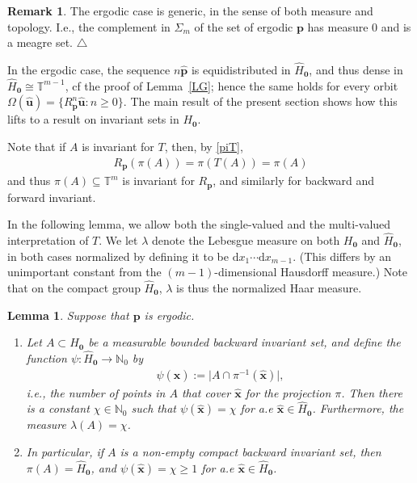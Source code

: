 \documentclass[11pt,reqno,tbtags,a4paper]{amsart}
\numberwithin{equation}{section}
\renewcommand\ge{\geq}
\renewcommand\geq{\geqslant}
\theoremstyle{plain}%
\newtheorem{lemma}[theorem]{Lemma}
\theoremstyle{definition}
\newcommand\xqed[1]{%
    \leavevmode\unskip\penalty9999 \hbox{}\nobreak\hfill
    \quad\hbox{#1}}
\newtheorem{remarkqqq}[theorem]{Remark}
\newenvironment{remark}{\begin{remarkqqq}}
  {\xqed{$\triangle$}\end{remarkqqq}}
\theoremstyle{remark}
\newenvironment{romenumerate}[1][-10pt]{%
\addtolength{\leftmargini}{#1}\begin{enumerate}%
 \renewcommand{\labelenumi}{\textup{(\roman{enumi})}}%
 \renewcommand{\theenumi}{\labelenumi}%
%
 }{\end{enumerate}}
\newcounter{cases}
\newcommand{\refL}[1]{Lemma~\ref{#1}}
\newcommand\set[1]{\ensuremath{\{#1\}}}
\newcommand\bigabs[1]{\bigl\lvert#1\bigr\rvert}
\newcommand\punkt{\xperiod}    %
\newcommand\cf{cf\punkt}
\newcommand{\aex}{a.e\punkt}
\newcommand\bbN{\mathbb N}
\newcommand\bbT{\mathbb T}
\newcommand\gl{\lambda}
\newcommand\gS{\Sigma}
\newcommand\qw{^{-1}}
\newcommand\ddx{\mathrm{d}}
\newcommand\Ho{H_{\0}}
\newcommand\hHo{\hH_{\0}}
\newcommand\vp{\mathbf{p}}
\newcommand\hvp{\hat{\mathbf{p}}}
\newcommand\hvu{{\hat{\mathbf{u}}}}
\newcommand\hvx{\hat{\mathbf{x}}}
\newcommand\Rp{R_\vp}
\newcommand\hH{\widehat{H}}
\newcommand\bbNo{\bbN_0}
\newcommand\0{{\boldsymbol 0}}
\newcommand\1{{\boldsymbol 1}}
\begin{document}
\begin{remark}
 The ergodic case is generic, in the sense of both measure and
topology.
I.e., the
complement in $\gS_m$ of the set of ergodic $\vp$ has measure 0
and is a meagre set. 
\end{remark}

In the ergodic case, 
the sequence $n\hvp$ is
equidistributed in $\hHo$, and thus dense in $\hHo\cong \bbT^{m-1}$, 
\cf{} the proof of \refL{LG}; hence the same holds for every orbit
$\Omega(\hvu)=\set{\Rp^n\hvu:n\ge0}$. 
The main result of the present section shows how this lifts to a result on
invariant sets in $\Ho$.

Note that if $A$ is invariant for $T$, then, by \eqref{piT},
\begin{align}\label{Rpinv}
  \Rp(\pi(A))=\pi(T(A))=\pi(A)
\end{align}
and thus $\pi(A)\subseteq\bbT^m$ is invariant for $\Rp$,
and similarly for backward and forward invariant.

In the following lemma, we allow both the single-valued and the multi-valued
interpretation of $T$.
We let $\gl$ denote the Lebesgue measure on both $\Ho$ and
$\hHo$, in both cases normalized  by defining
it to be  $\ddx x_1 \dotsm \ddx x_{m-1}$.
(This differs by an unimportant constant from the $(m-1)$-dimensional
Hausdorff measure.) 
Note that on the compact group $\hHo$, $\gl$ is thus the
normalized Haar measure.

\begin{lemma}\label{LC}
  Suppose that $\vp$ is ergodic.
  \begin{romenumerate}
    
  \item \label{LC1}
Let $A\subset\Ho$ be a measurable bounded backward invariant set,
and define the function $\psi:\hHo\to\bbNo$ by 
\begin{align}\label{psi} 
  \psi(\hvx):=\bigabs{A\cap\pi\qw(\hvx)},
\end{align}
i.e., the number of points in $A$ that cover $\hvx$ for the projection $\pi$.
Then there is a constant $\chi\in\bbNo$ such that $\psi(\hvx)=\chi$ for \aex{}
$\hvx\in\hHo$.
Furthermore, the measure $\gl(A)=\chi$.

\item \label{LC2}
In particular, if $A$ is a non-empty compact backward invariant set, then
$\pi(A)=\hHo$, and $\psi(\hvx)=\chi\ge1$ for \aex{} $\hvx\in\hHo$.
  \end{romenumerate}
\end{lemma}
\end{document}
